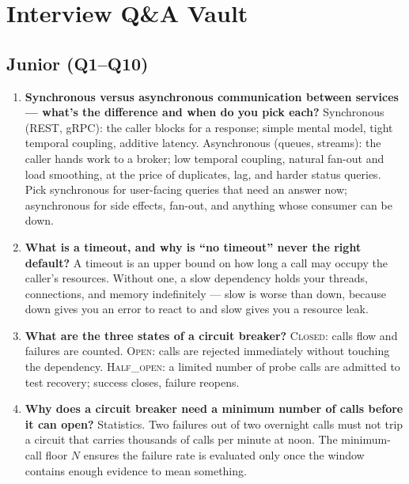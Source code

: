 \section{Interview Q\&A Vault}
\label{sec:ch15-interview}

\subsection*{Junior (Q1--Q10)}
\begin{enumerate}[label=\textbf{Q\arabic*.}, leftmargin=1.6cm]
  \item \textbf{Synchronous versus asynchronous communication between
        services --- what's the difference and when do you pick each?}
        Synchronous (REST, gRPC): the caller blocks for a response; simple
        mental model, tight temporal coupling, additive latency. Asynchronous
        (queues, streams): the caller hands work to a broker; low temporal
        coupling, natural fan-out and load smoothing, at the price of
        duplicates, lag, and harder status queries. Pick synchronous for
        user-facing queries that need an answer now; asynchronous for
        side effects, fan-out, and anything whose consumer can be down.
  \item \textbf{What is a timeout, and why is ``no timeout'' never the
        right default?}
        A timeout is an upper bound on how long a call may occupy the
        caller's resources. Without one, a slow dependency holds your
        threads, connections, and memory indefinitely --- slow is worse
        than down, because down gives you an error to react to and slow
        gives you a resource leak.
  \item \textbf{What are the three states of a circuit breaker?}
        \textsc{Closed}: calls flow and failures are counted.
        \textsc{Open}: calls are rejected immediately without touching the
        dependency. \textsc{Half\_open}: a limited number of probe calls
        are admitted to test recovery; success closes, failure reopens.
  \item \textbf{Why does a circuit breaker need a minimum number of calls
        before it can open?}
        Statistics. Two failures out of two overnight calls must not trip
        a circuit that carries thousands of calls per minute at noon. The
        minimum-call floor $N$ ensures the failure rate is evaluated only
        once the window contains enough evidence to mean something.

\end{enumerate}
